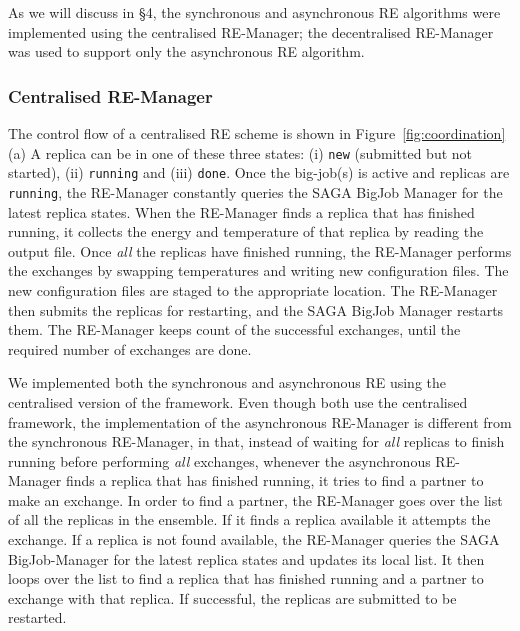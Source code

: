 \documentclass{rspublic}
\newcommand{\jhanote}[1]{ {\textcolor{red} { ***shantenu: #1 }}}
\newcommand{\jhanote}[1]{}
\begin{document}


As we will discuss in \S4, the synchronous and asynchronous RE
algorithms were implemented using the centralised RE-Manager; the
decentralised RE-Manager was used to support only the asynchronous RE
algorithm.


\subsubsection{Centralised RE-Manager}



The control flow of a centralised RE scheme is shown in
Figure~\ref{fig:coordination}(a) %
A replica can be in one of these three states:
(i) \texttt{new} (submitted but not started), (ii) \texttt{running}
and (iii) \texttt{done}.  Once the big-job(s) is active and replicas
are \texttt{running}, the RE-Manager constantly queries the SAGA
BigJob Manager for the latest replica states.  When the RE-Manager
finds a replica that has finished running, it collects the energy and
temperature of that replica by reading the output file. Once
\emph{all} the replicas have finished running, the RE-Manager performs
the exchanges by swapping temperatures and writing new configuration
files. The new configuration files are staged to the appropriate
location. The RE-Manager then submits the replicas for restarting, and
the SAGA BigJob Manager restarts them. The RE-Manager keeps count of
the successful exchanges, until the required number of exchanges are
done.

We implemented both the synchronous and asynchronous RE using the
centralised version of the framework. %
Even though both use the centralised framework, the implementation of
the asynchronous RE-Manager is different from the synchronous
RE-Manager, in that, instead of waiting for \emph{all} replicas to
finish running before performing \emph{all} exchanges, whenever the
asynchronous RE-Manager finds a replica that has finished running, it
tries to find a partner to make an exchange. In order to find a
partner, the RE-Manager goes over the list of all the replicas in the
ensemble. If it finds a replica available it attempts the exchange. If
a replica is not found available, the RE-Manager queries the SAGA
BigJob-Manager for the latest replica states and updates its local
list. It then loops over the list to find a replica that has finished
running and a partner to exchange with that replica.  If successful,
the replicas are submitted to be restarted.
\end{document}
